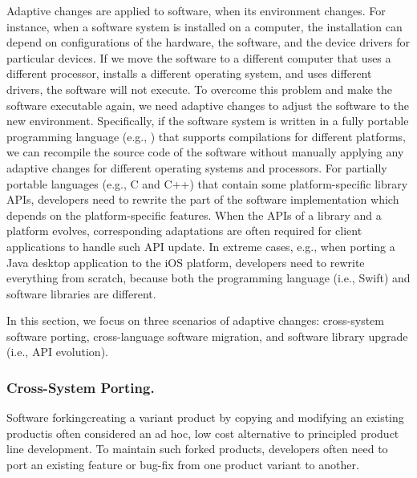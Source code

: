 Adaptive changes are applied to software, when its environment changes. For instance, when a software system is installed on a computer, the installation can depend on configurations of the hardware, the software, and the device drivers for particular devices. If we move the software to a different computer that uses a different processor, installs a different operating system, and uses different drivers, the software will not execute. To overcome this problem and make the software executable again, we need adaptive changes to adjust the software to the new environment. 
Specifically, if the software system is written in a fully portable programming language (e.g., ) that supports compilations for different platforms, we can recompile the source code of the software without manually applying any adaptive changes for different operating systems and processors. For partially portable languages (e.g., C and C++) that contain some platform-specific library APIs, developers need to rewrite the part of the software implementation which depends on the platform-specific features. When the APIs of a library and a platform evolves, corresponding adaptations are often required for client applications to handle such API update. 
In extreme cases, e.g., when porting a Java desktop application to the iOS platform, developers need to rewrite everything from scratch, because both the programming language (i.e., Swift) and software libraries are different. 

In this section, we focus on three scenarios of adaptive changes: cross-system software porting, cross-language software migration, and software library upgrade (i.e., API evolution).

\subsubsection{Cross-System Porting.} 
Software forking\textemdash creating a variant product by copying and modifying an existing product\textemdash is often considered an ad hoc, low cost alternative to principled product line development. To maintain such forked products, developers often need to port an existing feature or bug-fix from one product variant to another. 

